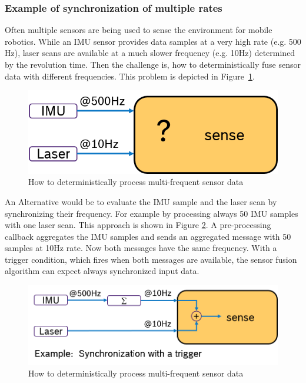 \subsubsection{Example of synchronization of multiple rates}
Often multiple sensors are being used to sense the environment for mobile robotics. While an IMU sensor provides data samples at a very high rate (e.g. 500 Hz), laser scans are available at a much slower frequency (e.g. 10Hz) determined by the revolution time. Then the challenge is, how to deterministically fuse sensor data with different frequencies. This problem is depicted in Figure~\ref{f:sensorFusion_01}.
\begin{figure}[htb!]
    \centering
    \includegraphics[width=0.75\linewidth]{Img/sensorFusion_01.png}
    \caption{How to deterministically process multi-frequent sensor data}\label{f:sensorFusion_01}
    \vspace{-0.1in}
\end{figure}

An Alternative would be to evaluate the IMU sample and the laser scan by synchronizing their frequency. For example by processing always 50 IMU samples with one laser scan. This approach is shown in Figure \ref{f:sensorFusion_02}. A pre-processing callback aggregates the IMU samples and sends an aggregated message with 50 samples at 10Hz rate. Now both messages have the same frequency. With a trigger condition, which fires when both messages are available, the sensor fusion algorithm can expect always synchronized input data.
\begin{figure}[htb!]
    \centering
    \includegraphics[width=0.75\linewidth]{Img/sensorFusion_02.png}
    \caption{How to deterministically process multi-frequent sensor data}\label{f:sensorFusion_02}
    \vspace{-0.1in}
\end{figure}

